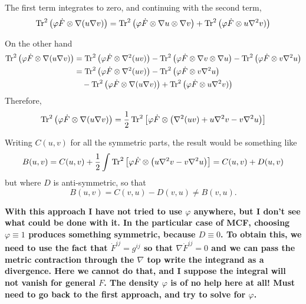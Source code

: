 \documentclass{amsart}
\begin{document}
The first term integrates to zero, and continuing with the second term,
\begin{align*}
\operatorname{Tr}^2\left(\varphi \dot{F} \otimes \nabla(u \nabla v)\right) = \operatorname{Tr}^2\left(\varphi \dot{F} \otimes \nabla u \otimes \nabla v\right) + \operatorname{Tr}^2\left(\varphi \dot{F} \otimes u \nabla^2 v)\right)
\end{align*}

On the other hand
\begin{align*}
\operatorname{Tr}^2\left(\varphi \dot{F} \otimes \nabla(u \nabla v)\right) &= \operatorname{Tr}^2\left(\varphi \dot{F} \otimes \nabla^2(uv)\right) - \operatorname{Tr}^2\left(\varphi \dot{F} \otimes \nabla v \otimes \nabla u\right)  - \operatorname{Tr}^2\left(\varphi \dot{F} \otimes v \nabla^2 u\right) \\
&=  \operatorname{Tr}^2\left(\varphi \dot{F} \otimes \nabla^2(uv)\right) - \operatorname{Tr}^2\left(\varphi \dot{F} \otimes v \nabla^2 u\right) \\
&\quad -\operatorname{Tr}^2\left(\varphi \dot{F} \otimes \nabla(u \nabla v)\right) + \operatorname{Tr}^2\left(\varphi \dot{F} \otimes u \nabla^2 v)\right)
\end{align*}
Therefore,
\[
\operatorname{Tr}^2\left(\varphi \dot{F} \otimes \nabla(u \nabla v)\right) = \frac{1}{2} \operatorname{Tr}^2\left[\varphi \dot{F} \otimes \left(\nabla^2(uv) + u \nabla^2 v - v \nabla^2 u\right)\right]
\]

Writing \(C(u,v)\) for all the symmetric parts, the result would be something like
\[
B(u, v) = C(u, v) + \frac{1}{2}\int \operatorname{Tr}^2\left[\varphi\dot{F} \otimes \left(u \nabla^2v - v \nabla^2 u\right) \right] = C(u, v) + D(u, v)
\]
but where \(D\) is anti-symmetric, so that
\[
B(u,v) = C(v,u) - D(v, u) \ne B(v,u).
\]

\textbf{With this approach I have not tried to use \(\varphi\) anywhere, but I don't see what could be done with it. In the particular case of MCF, choosing \(\varphi \equiv 1\) produces something symmetric, because \(D \equiv 0\). To obtain this, we need to use the fact that \(\dot{F}^{ij} = g^{ij}\) so that \(\nabla \dot{F}^{ij} = 0\) and we can pass the metric contraction through the \(\nabla\) top write the integrand as a divergence. Here we cannot do that, and I suppose the integral will not vanish for general \(F\). The density \(\varphi\) is of no help here at all! Must need to go back to the first approach, and try to solve for \(\varphi\).}
\end{document}
